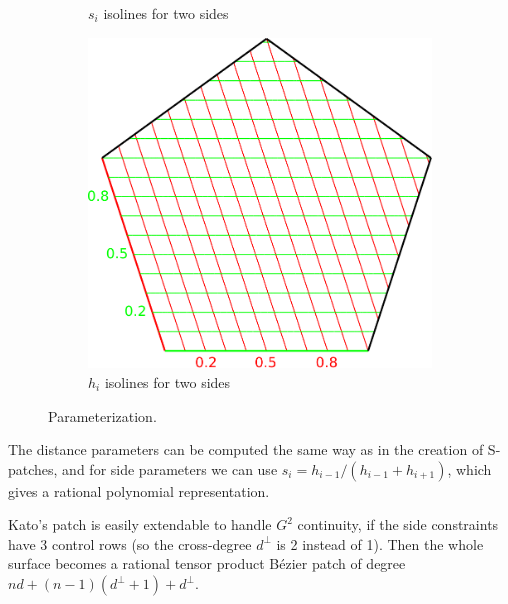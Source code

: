\documentclass{article}
\begin{document}
\begin{figure}[b!]
\begin{subfigure}{0.3\textwidth}
\begin{minipage}[b][5cm][b]{\textwidth}
      \vspace*{-2mm}
    \end{minipage}
    \caption{$s_i$ isolines for two sides}
    \label{fig:s}
  \end{subfigure}
  \hfill
  \begin{subfigure}{0.30\textwidth}
    \begin{minipage}[b][5cm][b]{\textwidth}
      \centering
      \includegraphics[width = \textwidth]{images/h-params.pdf}
      \vspace*{-2mm}
    \end{minipage}
    \caption{$h_i$ isolines for two sides}
    \label{fig:h}
  \end{subfigure}
  \caption{Parameterization.}
  \label{fig:parameters}
\end{figure}

The distance parameters can be computed the same way as in the creation of S-patches, and for side
parameters we can use $s_i=h_{i-1}/(h_{i-1}+h_{i+1})$, which gives a rational polynomial
representation.

Kato's patch is easily extendable to handle $G^2$ continuity, if the side constraints have 3
control rows (so the cross-degree $d^\perp$ is 2 instead of 1).
Then the whole surface becomes a rational tensor product B\'ezier patch of
degree $nd+(n-1)(d^\perp+1)+d^\perp$.
\end{document}
